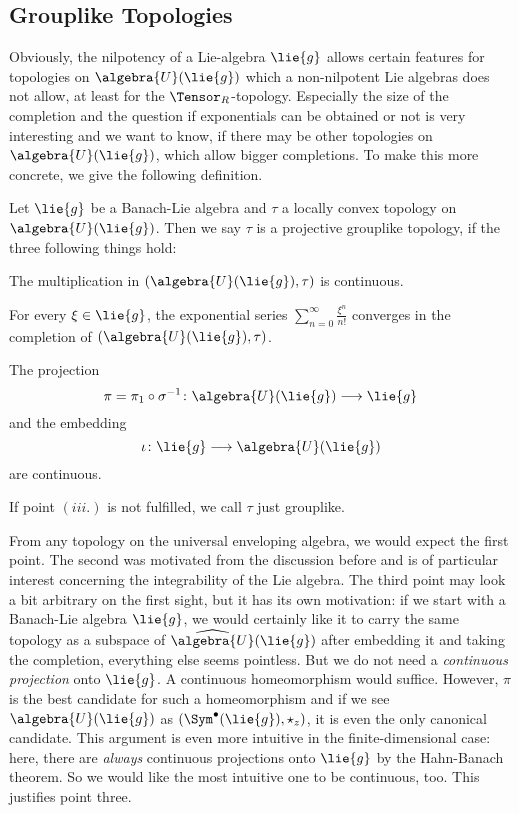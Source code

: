 \documentclass[
11pt,                          %
english                        %
]{article}
\begin{document}
\subsection{Grouplike Topologies}
Obviously, the nilpotency of a Lie-algebra $\lie{g}$ allows certain features for 
topologies on $\algebra{U}(\lie{g})$ which a non-nilpotent Lie algebras does not 
allow, at least for the $\Tensor_R$-topology. 
Especially the size of the completion and the question if exponentials can be 
obtained or not is very interesting and we want to know, if there may be 
other topologies on $\algebra{U}(\lie{g})$, which allow bigger completions. To make 
this more concrete, we give the following definition.
\begin{definition}
	\label{def:grouplike-topology}
	Let $\lie{g}$ be a Banach-Lie algebra and $\tau$ a locally convex topology on 
	$\algebra{U}(\lie{g})$. Then we say $\tau$ is a projective grouplike topology, 
	if the three following things hold:
	\begin{definitionlist}
		\item
		The multiplication in $(\algebra{U}(\lie{g}), \tau)$ is continuous.
		
		\item
		For every $\xi \in \lie{g}$, the exponential series $\sum_{n=0}^\infty 
		\frac{\xi^n}{n!}$ converges in the completion of $(\algebra{U}(\lie{g}), 
		\tau)$.
		
		\item
		The projection 
		\begin{equation}
			\label{eq:projection}
			\pi 
			= 
			\pi_1 \circ \sigma^{-1}
			\colon
			\algebra{U}(\lie{g})
			\longrightarrow
			\lie{g}
		\end{equation}
		and the embedding
		\begin{equation}
			\label{eq:embedding} 
			\iota \colon \lie{g} \longrightarrow \algebra{U}(\lie{g})
		\end{equation}	
		are continuous.
	\end{definitionlist}
	If point $(iii.)$ is not fulfilled, we call $\tau$ just grouplike.
\end{definition}
From any topology on the universal enveloping algebra, we would expect the first 
point. The second was motivated from the discussion before and is of particular 
interest concerning the integrability of the Lie algebra. The third point 
may look a bit arbitrary on the first sight, but it has its own motivation: if we 
start with a Banach-Lie algebra $\lie{g}$, we would certainly like it to carry the 
same topology as a subspace of $\widehat{\algebra{U}}(\lie{g})$ after embedding it 
and taking the completion, everything else seems pointless. But we do not need a 
\emph{continuous projection} onto $\lie{g}$. A continuous homeomorphism would 
suffice. However, $\pi$ is the best candidate for such a homeomorphism and if we
see $\algebra{U}(\lie{g})$ as $(\Sym^{\bullet}(\lie{g}), \star_z)$, it 
is even the only canonical candidate. This argument is even more intuitive in the 
finite-dimensional case: here, there are \emph{always} continuous projections onto 
$\lie{g}$ by the Hahn-Banach theorem. So we would like the most intuitive one to be 
continuous, too. This justifies point three.
\end{document}
